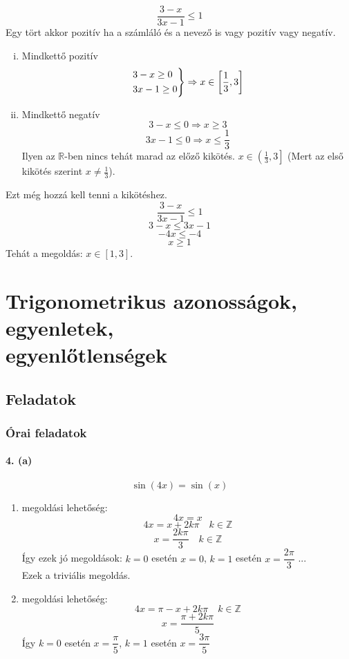 \documentclass[12pt,a4paper,fleqn]{article}
\newcommand{\myparagraph}[1]{\paragraph{#1}\mbox{}}
\begin{document}
\[ \dfrac{3-x}{3x-1} \leq 1 \]
Egy tört akkor pozitív ha a számláló és a nevező is vagy pozitív vagy negatív.
\begin{enumerate}[i.]
  \item Mindkettő pozitív
  \[
  \begin{rcases*}
    3-x \geq 0 \\
    3x -1 \geq 0 \\
  \end{rcases*} \Rightarrow x \in \left[ \frac{1}{3}, 3 \right]
  \]
  \item Mindkettő negatív
  \[ 3-x \leq 0 \Rightarrow x \geq 3 \]
  \[ 3x -1 \leq 0 \Rightarrow x \leq \frac{1}{3} \]
  Ilyen az $\mathbb{R}$-ben nincs tehát marad az előző kikötés.
  $x \in \left( \frac{1}{3}, 3 \right]$ (Mert az első kikötés szerint
  $ x \neq \frac{1}{3}$).
\end{enumerate}
Ezt még hozzá kell tenni a kikötéshez.
\[ \dfrac{3-x}{3x-1} \leq 1 \]
\[ 3-x \leq 3x-1 \]
\[ -4x \leq -4 \]
\[ x \geq 1 \]
Tehát a megoldás: $x \in \left[ 1, 3 \right]$.

\clearpage
\section{Trigonometrikus azonosságok, egyenletek, \\ egyenlőtlenségek}
\setcounter{subsection}{1}
\subsection{Feladatok}
\subsubsection{Órai feladatok}


\myparagraph{4. (a)}
\[ \sin(4x) = \sin(x) \]
\begin{enumerate}
  \item megoldási lehetőség:
  \[ 4x = x \]
  \[ 4x = x + 2k\pi \quad k \in \mathbb{Z} \]
  \[ x = \dfrac{2k\pi}{3} \quad k \in \mathbb{Z} \]
  Így ezek jó megoldások: $k = 0$ esetén $x = 0$, $k = 1$ esetén $x =
    \dfrac{2\pi}{3}$ ... \\
  Ezek a triviális megoldás.
  \item megoldási lehetőség:
  \[ 4x = \pi - x + 2k\pi \quad k \in \mathbb{Z} \]
  \[ x = \dfrac{\pi + 2k\pi}{5} \]
  Így $k = 0$ esetén $x = \dfrac{\pi}{5}$, $k = 1$ esetén $x = \dfrac{3\pi}{5}$
\end{enumerate}
\end{document}
